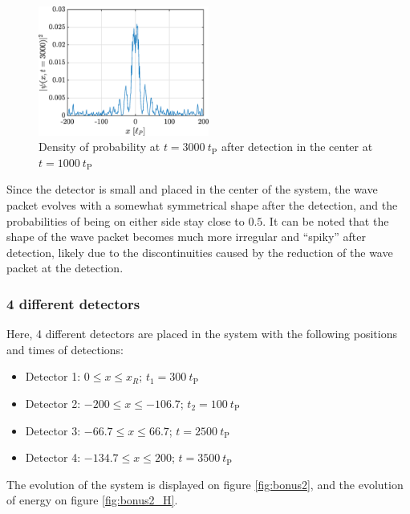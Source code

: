 \documentclass[a4paper,12pt,twoside]{article}
\begin{document}
      \begin{figure}[h!]
      \centering
       \includegraphics[width=0.5\textwidth]{graphs/bonus1_psi.eps}
       \caption{Density of probability at $t=3000~t_\text{P}$ after detection in the center at $t=1000~t_\text{P}$}
       \label{fig:bonus1_psi}
      \end{figure}
      
      Since the detector is small and placed in the center of the system, the wave packet evolves with a somewhat symmetrical shape after the detection, and the probabilities of being on either side stay close to $0.5$. It can be noted that the shape of the wave packet becomes much more irregular and ``spiky'' after detection, likely due to the discontinuities caused by the reduction of the wave packet at the detection.


    \subsubsection{4 different detectors}
    Here, 4 different detectors are placed in the system with the following positions and times of detections:
    \begin{itemize}
     \item Detector 1: $0\leq x\leq x_R$; $t_1=300~t_\text{P}$
     \item Detector 2: $-200\leq x\leq -106.7$; $t_2=100~t_\text{P}$
     \item Detector 3: $-66.7\leq x\leq 66.7$; $t=2500~t_\text{P}$
     \item Detector 4: $-134.7\leq x\leq 200$; $t=3500~t_\text{P}$
    \end{itemize}
    
    The evolution of the system is displayed on figure \ref{fig:bonus2}, and the evolution of energy on figure \ref{fig:bonus2_H}.
\end{document}
